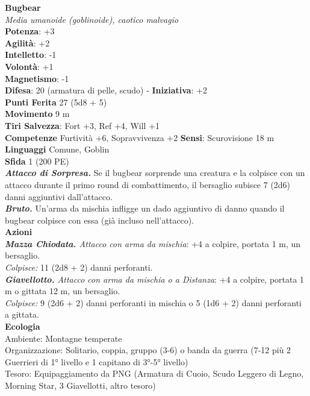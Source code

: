 \begin{multicols}{2}
\medskip\textbf{Bugbear}\\
\emph{Media umanoide (goblinoide), caotico malvagio}\\
\textbf{Potenza}: +3\\
\textbf{Agilità}: +2\\
\textbf{Intelletto}: -1\\
\textbf{Volontà}: +1\\
\textbf{Magnetismo}: -1\\
\textbf{Difesa}: 20 (armatura di pelle, scudo) - \textbf{Iniziativa}: +2\\
\textbf{Punti Ferita} 27 (5d8 + 5)\\
\textbf{Movimento} 9 m\\
\textbf{Tiri Salvezza}: Fort +3, Ref +4, Will +1\\
\textbf{Competenze} Furtività +6, Sopravvivenza +2
\textbf{Sensi}: Scurovisione 18 m \\
\textbf{Linguaggi} Comune, Goblin\\
\textbf{Sfida} 1 (200 PE)\smallskip\\
\emph{\textbf{Attacco di Sorpresa.}} Se il bugbear sorprende una creatura e la colpisce con un attacco durante il primo round di combattimento, il bersaglio subisce 7 (2d6) danni aggiuntivi dall'attacco.\\
\emph{\textbf{Bruto.}} Un'arma da mischia infligge un dado aggiuntivo di danno quando il bugbear colpisce con essa (già incluso nell'attacco).\\
\smallskip\textbf{Azioni}\\
\emph{\textbf{Mazza Chiodata.} Attacco con arma da mischia}: +4 a colpire, portata 1 m, un bersaglio.\\
\emph{Colpisce:} 11 (2d8 + 2) danni perforanti.\\
\emph{\textbf{Giavellotto.} Attacco con arma da mischia o a Distanza}: +4 a colpire, portata 1 m o gittata 12 m, un bersaglio.\\
\emph{Colpisce:} 9 (2d6 + 2) danni perforanti in mischia o 5 (1d6 + 2) danni perforanti a gittata.\\
\textbf{Ecologia}\\
Ambiente: Montagne temperate\\
Organizzazione: Solitario, coppia, gruppo (3-6) o banda da guerra (7-12 più 2 Guerrieri di 1° livello e 1 capitano di 3°-5° livello)\\
Tesoro: Equipaggiamento da PNG (Armatura di Cuoio, Scudo Leggero di Legno, Morning Star, 3 Giavellotti, altro tesoro)\\

\end{multicols}
